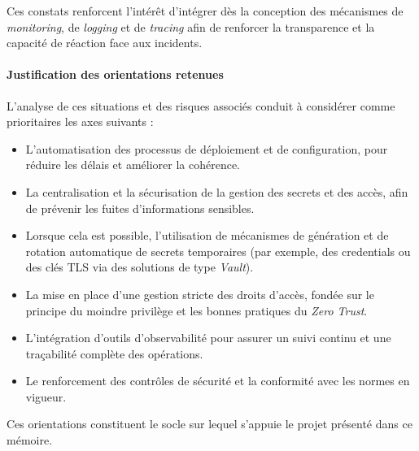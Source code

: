 Ces constats renforcent l’intérêt d’intégrer dès la conception des mécanismes de \emph{monitoring}, de \emph{logging} et de \emph{tracing} afin de renforcer la transparence et la capacité de réaction face aux incidents.

\paragraph{\textbf{Justification des orientations retenues}}

L’analyse de ces situations et des risques associés conduit à considérer comme prioritaires les axes suivants :

\begin{itemize}
	\item L’automatisation des processus de déploiement et de configuration, pour réduire les délais et améliorer la cohérence.
	\item La centralisation et la sécurisation de la gestion des secrets et des accès, afin de prévenir les fuites d’informations sensibles.
	\item Lorsque cela est possible, l’utilisation de mécanismes de génération et de rotation automatique de secrets temporaires (par exemple, des credentials ou des clés TLS via des solutions de type \emph{Vault}).
	\item La mise en place d’une gestion stricte des droits d’accès, fondée sur le principe du moindre privilège et les bonnes pratiques du \emph{Zero Trust}.
	\item L’intégration d’outils d’observabilité pour assurer un suivi continu et une traçabilité complète des opérations.
	\item Le renforcement des contrôles de sécurité et la conformité avec les normes en vigueur.
\end{itemize}

Ces orientations constituent le socle sur lequel s'appuie le projet présenté dans ce mémoire.


